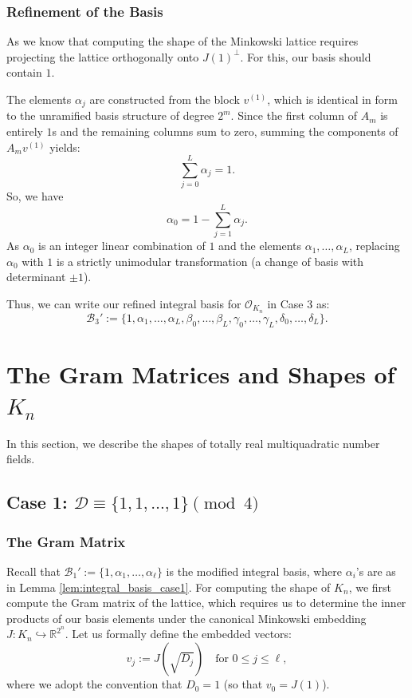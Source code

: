 \documentclass{amsart}
\newcommand{\R}{\mathbb{R}}
\newcommand{\Z}{\mathbb{Z}}
\theoremstyle{plain}
\theoremstyle{definition}
\theoremstyle{remark}
\numberwithin{equation}{section}
\begin{document}
\subsubsection*{Refinement of the Basis}

As we know that computing the shape of the Minkowski lattice requires projecting the lattice orthogonally onto $J(1)^\perp$. For this, our basis should contain $1$. 

The elements $\alpha_j$ are constructed from the block $v^{(1)}$, which is identical in form to the unramified basis structure of degree $2^m$. Since the first column of $A_m$ is entirely $1$s and the remaining columns sum to zero, summing the components of $A_m v^{(1)}$ yields:
\[
    \sum_{j=0}^L \alpha_j = 1.
\]
So, we have
\[
    \alpha_0 = 1 - \sum_{j=1}^L \alpha_j.
\]
As $\alpha_0$ is an integer linear combination of $1$ and the elements $\alpha_1, \ldots, \alpha_L$, replacing $\alpha_0$ with $1$ is a strictly unimodular transformation (a change of basis with determinant $\pm 1$). 

Thus, we can write our refined integral basis for $\mathcal{O}_{K_n}$ in Case 3 as:
\[
    \mathcal{B}_3' := \{1, \alpha_1, \ldots, \alpha_L, \beta_0, \ldots, \beta_L, \gamma_0, \ldots, \gamma_L, \delta_0, \ldots, \delta_L\}.
\]
\section{The Gram Matrices and Shapes of $K_n$}
\par In this section, we describe the shapes of totally real multiquadratic number fields.
\subsection{Case 1: \texorpdfstring{$\mathcal{D} \equiv \{1, 1, \ldots, 1\} \pmod 4$}{Case 1}} 
\subsubsection*{The Gram Matrix} Recall that $\mathcal{B}_1' := \{1, \alpha_1, \ldots, \alpha_{\ell}\}$ is the modified integral basis, where $\alpha_i$'s are as in Lemma \ref{lem:integral_basis_case1}. For computing the shape of $K_n$, we first compute the Gram matrix of the lattice, which requires us to determine the inner products of our basis elements under the canonical Minkowski embedding $J : K_n \hookrightarrow \R^{2^n}$. Let us formally define the embedded vectors:
\[
    v_j := J(\sqrt{D_j}) \quad \text{for } 0 \leq j \leq \ell,
\]
where we adopt the convention that $D_0 = 1$ (so that $v_0 = J(1)$).
\end{document}
